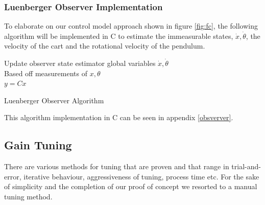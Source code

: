 \documentclass[12pt]{article}
\begin{document}
\subsubsection{Luenberger Observer Implementation}
To elaborate on our control model approach shown in figure \ref{fig:fc}, the following algorithm will be implemented in C to estimate the immeasurable states, $\dot{x}, \dot{\theta}$, the velocity of the cart and the rotational velocity of the pendulum.\\

\footnotesize
\begin{algorithm}[H]
    \SetAlgoLined
    Update observer state estimator global variables $\dot{x},\dot{\theta}$\\
    Based off measurements of $x,\theta$\\
    \bigskip
    $y = Cx$\\
    \caption{Luenberger Observer Algorithm}
\end{algorithm}

\normalsize
This algorithm implementation in C can be seen in appendix \ref{obsverver}.

\subsection{Gain Tuning}
There are various methods for tuning that are proven and that range in trial-and-error, iterative behaviour,  aggressiveness of tuning, process time etc. For the sake of simplicity and the completion of our proof of concept we resorted to a manual tuning method. 
\end{document}

